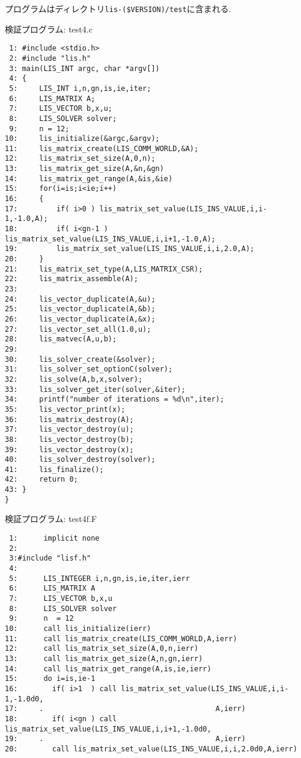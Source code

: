 \documentclass[a4paper]{jarticle}
\begin{document}
{{プログラムはディレクトリ\verb|lis-($VERSION)/test|に含まれる. 
\begin{itembox}[l]{検証プログラム: test4.c}
{\small
\begin{verbatim}
 1: #include <stdio.h> 
 2: #include "lis.h" 
 3: main(LIS_INT argc, char *argv[]) 
 4: { 
 5:     LIS_INT i,n,gn,is,ie,iter; 
 6:     LIS_MATRIX A; 
 7:     LIS_VECTOR b,x,u; 
 8:     LIS_SOLVER solver; 
 9:     n = 12; 
10:     lis_initialize(&argc,&argv); 
11:     lis_matrix_create(LIS_COMM_WORLD,&A); 
12:     lis_matrix_set_size(A,0,n); 
13:     lis_matrix_get_size(A,&n,&gn) 
14:     lis_matrix_get_range(A,&is,&ie) 
15:     for(i=is;i<ie;i++) 
16:     { 
17:         if( i>0 ) lis_matrix_set_value(LIS_INS_VALUE,i,i-1,-1.0,A); 
18:         if( i<gn-1 ) lis_matrix_set_value(LIS_INS_VALUE,i,i+1,-1.0,A); 
19:         lis_matrix_set_value(LIS_INS_VALUE,i,i,2.0,A); 
20:     } 
21:     lis_matrix_set_type(A,LIS_MATRIX_CSR); 
22:     lis_matrix_assemble(A); 
23:  
24:     lis_vector_duplicate(A,&u); 
25:     lis_vector_duplicate(A,&b); 
26:     lis_vector_duplicate(A,&x); 
27:     lis_vector_set_all(1.0,u); 
28:     lis_matvec(A,u,b); 
29:  
30:     lis_solver_create(&solver); 
31:     lis_solver_set_optionC(solver); 
32:     lis_solve(A,b,x,solver); 
33:     lis_solver_get_iter(solver,&iter); 
34:     printf("number of iterations = %d\n",iter); 
35:     lis_vector_print(x); 
36:     lis_matrix_destroy(A); 
37:     lis_vector_destroy(u); 
38:     lis_vector_destroy(b); 
39:     lis_vector_destroy(x); 
40:     lis_solver_destroy(solver); 
41:     lis_finalize(); 
42:     return 0; 
43: } 
}
\end{verbatim}
}
\end{itembox}
\begin{itembox}[l]{検証プログラム: test4f.F}
{\small
\begin{verbatim}
 1:      implicit none
 2:      
 3:#include "lisf.h"
 4:
 5:      LIS_INTEGER i,n,gn,is,ie,iter,ierr
 6:      LIS_MATRIX A
 7:      LIS_VECTOR b,x,u
 8:      LIS_SOLVER solver
 9:      n  = 12
10:      call lis_initialize(ierr)
11:      call lis_matrix_create(LIS_COMM_WORLD,A,ierr)
12:      call lis_matrix_set_size(A,0,n,ierr)
13:      call lis_matrix_get_size(A,n,gn,ierr)
14:      call lis_matrix_get_range(A,is,ie,ierr)
15:      do i=is,ie-1
16:        if( i>1  ) call lis_matrix_set_value(LIS_INS_VALUE,i,i-1,-1.0d0,
17:     .                                        A,ierr)
18:        if( i<gn ) call lis_matrix_set_value(LIS_INS_VALUE,i,i+1,-1.0d0,
19:     .                                        A,ierr)
20:        call lis_matrix_set_value(LIS_INS_VALUE,i,i,2.0d0,A,ierr)

\end{verbatim}}
\end{itembox}}}
\end{document}
